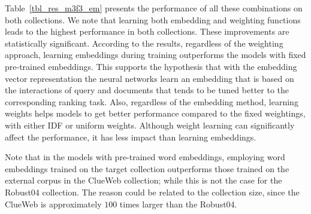 \documentclass[sigconf]{acmart}
\newcommand{\feedthree}{embedding vector representation\xspace}
\begin{document}
Table~\ref{tbl_res_m3f3_em} presents the performance of all these combinations on both collections. 
We note that learning both embedding and weighting functions leads to the highest performance in both collections. These improvements are statistically significant.
According to the results, regardless of the weighting approach, learning embeddings during training outperforms the models with fixed pre-trained embeddings.
This supports the hypothesis that with the \feedthree the neural networks learn an embedding that is based on the interactions of query and documents that tends to be tuned better to the corresponding ranking task.
Also, regardless of the embedding method, learning weights helps models to get better performance compared to the fixed weightings, with either IDF or uniform weights. 
Although weight learning can significantly affect the performance, it has less impact than learning embeddings.

Note that in the models with pre-trained word embeddings, employing word embeddings trained on the target collection outperforms those trained on the external corpus in the ClueWeb collection; while this is not the case for the Robust04 collection. The reason could be related to the collection size, since the ClueWeb is approximately $100$ times larger than the Robust04.
\end{document}
